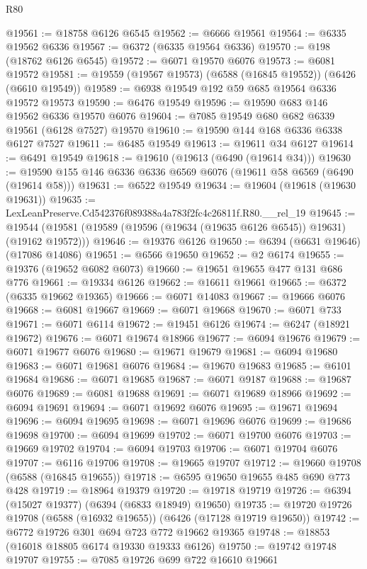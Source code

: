 \begin{lexlean}{R80}
\begin{coremodule}
@19561 := @18758 @6126 @6545
@19562 := @6666 @19561
@19564 := @6335 @19562 @6336
@19567 := @6372 (@6335 @19564 @6336)
@19570 := @198 (@18762 @6126 @6545)
@19572 := @6071 @19570 @6076
@19573 := @6081 @19572
@19581 := @19559 (@19567 @19573) (@6588 (@16845 @19552)) (@6426 (@6610 @19549))
@19589 := @6938 @19549 @192 @59 @685 @19564 @6336 @19572 @19573
@19590 := @6476 @19549
@19596 := @19590 @683 @146 @19562 @6336 @19570 @6076
@19604 := @7085 @19549 @680 @682 @6339 @19561 (@6128 @7527) @19570
@19610 := @19590 @144 @168 @6336 @6338 @6127 @7527
@19611 := @6485 @19549
@19613 := @19611 @34 @6127
@19614 := @6491 @19549
@19618 := @19610 (@19613 (@6490 (@19614 @34)))
@19630 := @19590 @155 @146 @6336 @6336 @6569 @6076 (@19611 @58 @6569 (@6490 (@19614 @58)))
@19631 := @6522 @19549
@19634 := @19604 (@19618 (@19630 @19631))
@19635 := LexLeanPreserve.Cd542376f089388a4a783f2fc4c26811f.R80.__rel_19
@19645 := @19544 (@19581 (@19589 (@19596 (@19634 (@19635 @6126 @6545)) @19631) (@19162 @19572)))
@19646 := @19376 @6126
@19650 := @6394 (@6631 @19646) (@17086 @14086)
@19651 := @6566 @19650
@19652 := @2 @6174
@19655 := @19376 (@19652 @6082 @6073)
@19660 := @19651 @19655 @477 @131 @686 @776
@19661 := @19334 @6126
@19662 := @16611 @19661
@19665 := @6372 (@6335 @19662 @19365)
@19666 := @6071 @14083
@19667 := @19666 @6076
@19668 := @6081 @19667
@19669 := @6071 @19668
@19670 := @6071 @733
@19671 := @6071 @6114
@19672 := @19451 @6126
@19674 := @6247 (@18921 @19672)
@19676 := @6071 @19674 @18966
@19677 := @6094 @19676
@19679 := @6071 @19677 @6076
@19680 := @19671 @19679
@19681 := @6094 @19680
@19683 := @6071 @19681 @6076
@19684 := @19670 @19683
@19685 := @6101 @19684
@19686 := @6071 @19685
@19687 := @6071 @9187
@19688 := @19687 @6076
@19689 := @6081 @19688
@19691 := @6071 @19689 @18966
@19692 := @6094 @19691
@19694 := @6071 @19692 @6076
@19695 := @19671 @19694
@19696 := @6094 @19695
@19698 := @6071 @19696 @6076
@19699 := @19686 @19698
@19700 := @6094 @19699
@19702 := @6071 @19700 @6076
@19703 := @19669 @19702
@19704 := @6094 @19703
@19706 := @6071 @19704 @6076
@19707 := @6116 @19706
@19708 := @19665 @19707
@19712 := @19660 @19708 (@6588 (@16845 @19655))
@19718 := @6595 @19650 @19655 @485 @690 @773 @428
@19719 := @18964 @19379
@19720 := @19718 @19719
@19726 := @6394 (@15027 @19377) (@6394 (@6833 @18949) @19650)
@19735 := @19720 @19726 @19708 (@6588 (@16932 @19655)) (@6426 (@17128 @19719 @19650))
@19742 := @6772 @19726 @301 @694 @723 @772 @19662 @19365
@19748 := @18853 (@16018 @18805 @6174 @19330 @19333 @6126)
@19750 := @19742 @19748 @19707
@19755 := @7085 @19726 @699 @722 @16610 @19661

\end{coremodule}
\end{lexlean}

